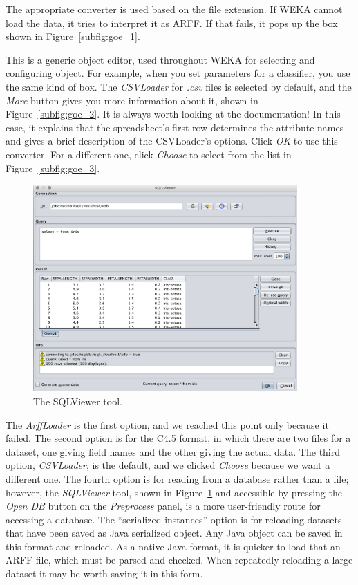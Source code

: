 The appropriate converter is used based on the file extension. If WEKA
cannot load the data, it tries to interpret it as ARFF. If that fails,
it pops up the box shown in Figure~\ref{subfig:goe_1}.

This is a generic object editor, used throughout WEKA for selecting
and configuring object. For example, when you set parameters for a
classifier, you use the same kind of box. The \textit{CSVLoader} for
\textit{.csv} files is selected by default, and the \textit{More}
button gives you more information about it, shown in
Figure~\ref{subfig:goe_2}. It is always worth looking at the
documentation! In this case, it explains that the spreadsheet's first
row determines the attribute names and gives a brief description of
the CSVLoader's options. Click \textit{OK} to use this converter. For
a different one, click \textit{Choose} to select from the list in
Figure~\ref{subfig:goe_3}.

\begin{figure}[!th]
\centering
\includegraphics[width=0.9\textwidth]{images/B2_8.png}
\caption{The SQLViewer tool.}
\label{fig:sql_viewer}
\end{figure}


The \textit{ArffLoader} is the first option, and we reached this point
only because it failed. The second option is for the C4.5 format, in
which there are two files for a dataset, one giving field names and
the other giving the actual data. The third option,
\textit{CSVLoader}, is the default, and we clicked \textit{Choose}
because we want a different one. The fourth option is for reading from
a database rather than a file; however, the \textit{SQLViewer} tool,
shown in Figure~\ref{fig:sql_viewer} and accessible by pressing the \textit{Open DB}
button on the \textit{Preprocess} panel, is a more user-friendly route
for accessing a database. The ``serialized instances'' option is for
reloading datasets that have been saved as Java serialized object. Any
Java object can be saved in this format and reloaded. As a native Java
format, it is quicker to load that an ARFF file, which must be parsed
and checked. When repeatedly reloading a large dataset it may be worth
saving it in this form.

